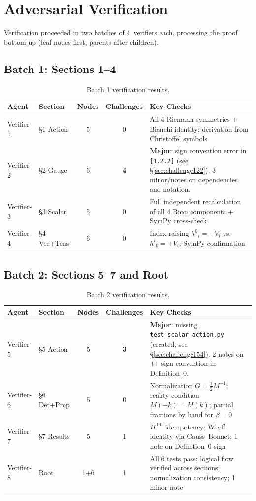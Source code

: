 \documentclass[11pt,a4paper]{article}
\newcommand{\dbox}{\Box}
\newcommand{\TT}{\mathrm{TT}}
\newcommand{\afnode}[1]{\texttt{[#1]}}
\begin{document}
\section{Adversarial Verification}
\label{sec:verification}

Verification proceeded in two batches of 4~verifiers each, processing the proof
bottom-up (leaf nodes first, parents after children).

\subsection{Batch 1: Sections 1--4}

\begin{longtable}{llccp{5.5cm}}
\toprule
\textbf{Agent} & \textbf{Section} & \textbf{Nodes} & \textbf{Challenges} & \textbf{Key Checks} \\
\midrule
\endhead
Verifier-1 & \S1 Action & 5 & 0 &
All 4 Riemann symmetries + Bianchi identity; derivation from Christoffel symbols \\
Verifier-2 & \S2 Gauge & 6 & \textbf{4} &
\textbf{Major}: sign convention error in \afnode{1.2.2} (see \S\ref{sec:challenge122}).
3 minor/notes on dependencies and notation. \\
Verifier-3 & \S3 Scalar & 5 & 0 &
Full independent recalculation of all 4 Ricci components + SymPy cross-check \\
Verifier-4 & \S4 Vec+Tens & 6 & 0 &
Index raising $h^0{}_i = -V_i$ vs.\ $h^i{}_0 = +V_i$; SymPy confirmation \\
\bottomrule
\caption{Batch 1 verification results.}
\end{longtable}

\subsection{Batch 2: Sections 5--7 and Root}

\begin{longtable}{llccp{5.5cm}}
\toprule
\textbf{Agent} & \textbf{Section} & \textbf{Nodes} & \textbf{Challenges} & \textbf{Key Checks} \\
\midrule
\endhead
Verifier-5 & \S5 Action & 5 & \textbf{3} &
\textbf{Major}: missing \texttt{test\_scalar\_action.py} (created, see \S\ref{sec:challenge154}).
2 notes on $\dbox$ sign convention in Definition~0. \\
Verifier-6 & \S6 Det+Prop & 5 & 0 &
Normalization $G = \tfrac{1}{2}M^{-1}$; reality condition $M(-k) = M(k)$;
partial fractions by hand for $\beta = 0$ \\
Verifier-7 & \S7 Results & 5 & 1 &
$\Pi^{\TT}$ idempotency; Weyl$^2$ identity via Gauss--Bonnet;
1 note on Definition~0 sign \\
Verifier-8 & Root & 1+6 & 1 &
All 6 tests pass; logical flow verified across sections;
normalization consistency; 1 minor note \\
\bottomrule
\caption{Batch 2 verification results.}
\end{longtable}
\end{document}
